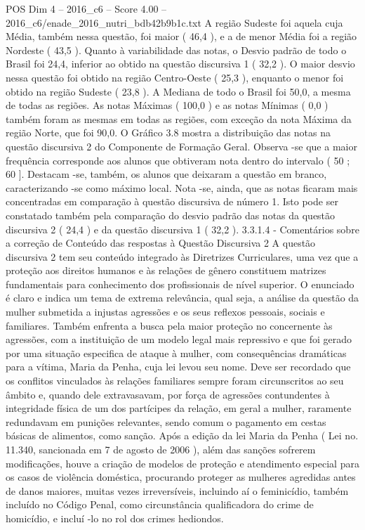 \begin{textsample}{POS Dim 4 – 2016\_c6 – Score 4.00 – 2016\_c6/enade\_2016\_nutri\_bdb42b9b1c.txt}
A região Sudeste foi aquela cuja Média, também nessa questão, foi maior ( 46,4 ), e a de menor Média foi a região Nordeste ( 43,5 ).
Quanto à variabilidade das notas, o Desvio padrão de todo o Brasil foi 24,4, inferior ao obtido na questão discursiva 1 ( 32,2 ).
O maior desvio nessa questão foi obtido na região Centro-Oeste ( 25,3 ), enquanto o menor foi obtido na região Sudeste ( 23,8 ).
A Mediana de todo o Brasil foi 50,0, a mesma de todas as regiões.
As notas Máximas ( 100,0 ) e as notas Mínimas ( 0,0 ) também foram as mesmas em todas as regiões, com exceção da nota Máxima da região Norte, que foi 90,0.
O Gráfico 3.8 mostra a distribuição das notas na questão discursiva 2 do Componente de Formação Geral.
Observa -se que a maior frequência corresponde aos alunos que obtiveram nota dentro do intervalo ( 50 ; 60 ].
Destacam -se, também, os alunos que deixaram a questão em branco, caracterizando -se como máximo local.
Nota -se, ainda, que as notas ficaram mais concentradas em comparação à questão discursiva de número 1.
Isto pode ser constatado também pela comparação do desvio padrão das notas da questão discursiva 2 ( 24,4 ) e da questão discursiva 1 ( 32,2 ). 3.3.1.4 - Comentários sobre a correção de Conteúdo das respostas à Questão Discursiva 2 A questão discursiva 2 tem seu conteúdo integrado às Diretrizes Curriculares, uma vez que a proteção aos direitos humanos e às relações de gênero constituem matrizes fundamentais para conhecimento dos profissionais de nível superior.
O enunciado é claro e indica um tema de extrema relevância, qual seja, a análise da questão da mulher submetida a injustas agressões e os seus reflexos pessoais, sociais e familiares.
Também enfrenta a busca pela maior proteção no concernente às agressões, com a instituição de um modelo legal mais repressivo e que foi gerado por uma situação especifica de ataque à mulher, com consequências dramáticas para a vítima, Maria da Penha, cuja lei levou seu nome.
Deve ser recordado que os conflitos vinculados às relações familiares sempre foram circunscritos ao seu âmbito e, quando dele extravasavam, por força de agressões contundentes à integridade física de um dos partícipes da relação, em geral a mulher, raramente redundavam em punições relevantes, sendo comum o pagamento em cestas básicas de alimentos, como sanção.
Após a edição da lei Maria da Penha ( Lei no. 11.340, sancionada em 7 de agosto de 2006 ), além das sanções sofrerem modificações, houve a criação de modelos de proteção e atendimento especial para os casos de violência doméstica, procurando proteger as mulheres agredidas antes de danos maiores, muitas vezes irreversíveis, incluindo aí o feminicídio, também incluído no Código Penal, como circunstância qualificadora do crime de homicídio, e incluí -lo no rol dos crimes hediondos.

\end{textsample}
